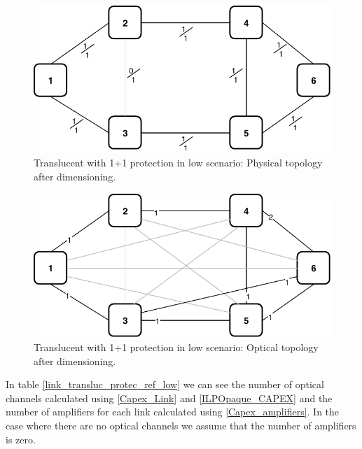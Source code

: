 \begin{figure}[h!]
\centering
\includegraphics[width=12cm]{sdf/ilp/translucent_protection/figures/physical_topology_low}
\caption{Translucent with 1+1 protection in low scenario: Physical topology after dimensioning.}
\label{physical3_protectionlow}
\end{figure}

\begin{figure}[h!]
\centering
\includegraphics[width=12cm]{sdf/ilp/translucent_protection/figures/optical_topology_low}
\caption{Translucent with 1+1 protection in low scenario: Optical topology after dimensioning.}
\label{optical3_protectionlow}
\end{figure}

\newpage
In table \ref{link_transluc_protec_ref_low} we can see the number of optical channels calculated using \ref{Capex_Link} and \ref{ILPOpaque_CAPEX} and the number of amplifiers for each link calculated using \ref{Capex_amplifiers}. In the case where there are no optical channels we assume that the number of amplifiers is zero.\\

